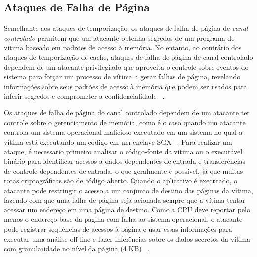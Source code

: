 \documentclass[review]{elsarticle}
\begin{document}
\subsection{Ataques de Falha de Página}

Semelhante aos ataques de temporização, os ataques de falha de página de \emph{canal controlado} permitem que um atacante obtenha segredos de um programa de vítima baseado em padrões de acesso à memória. No entanto, ao contrário dos ataques de temporização de cache, ataques de falha de página de canal controlado dependem de um atacante privilegiado que aproveita o controle sobre eventos do sistema para forçar um processo de vítima a gerar falhas de página, revelando informações sobre seus padrões de acesso à memória que podem ser usados para inferir segredos e comprometer a confidencialidade ~\cite{xu_controlled-channel_2015}.

Os ataques de falha de página do canal controlado dependem de um atacante ter controle sobre o gerenciamento de memória, como é o caso quando um atacante controla um sistema operacional malicioso executado em um sistema no qual a vítima está executando um código em um enclave SGX ~\cite{intel_corporation_tutorial_2015}. Para realizar um ataque, é necessario primeiro analisar o código-fonte da vítima ou o executável binário para identificar acessos a dados dependentes de entrada e transferências de controle dependentes de entrada, o que geralmente é possível, já que muitas rotas criptográficas são de código aberto. Quando o aplicativo é executado, o atacante pode restringir o acesso a um conjunto de destino das páginas da vítima, fazendo com que uma falha de página seja acionada sempre que a vítima tentar acessar um endereço em uma página de destino. Como a CPU deve reportar pelo menos o endereço base da página com falha ao sistema operacional, o atacante pode registrar sequências de acessos à página e usar essas informações para executar uma análise off-line e fazer inferências sobre os dados secretos da vítima com granularidade no nível da página (4 KB) ~\cite{xu_controlled-channel_2015, shinde_preventing_2015}.
\end{document}
